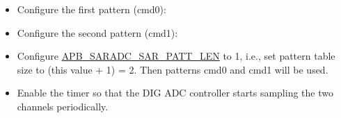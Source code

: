 \documentclass[main\_\_EN.tex]{subfiles}
\begin{document}
\begin{itemize}
    \item Configure the first pattern (cmd0):

\centering
{}%
%
%
\reglabel{}\regnewline%
\begin{regdesc}\end{regdesc}
\end{itemize}

\begin{itemize}
    \item Configure the second pattern (cmd1):

\centering
{}%
%
%
\reglabel{}\regnewline%
\begin{regdesc}\end{regdesc}
\end{itemize}

\begin{itemize}
    \item Configure \hyperref[fielddesc:APBSARADCSARPATTLEN]{APB\_SARADC\_SAR\_PATT\_LEN} to 1, i.e., set pattern table size to (this value + 1) = 2. Then patterns cmd0 and cmd1 will be used. 
    \item Enable the timer so that the DIG ADC controller starts sampling the two channels periodically.
\end{itemize}
\end{document}
